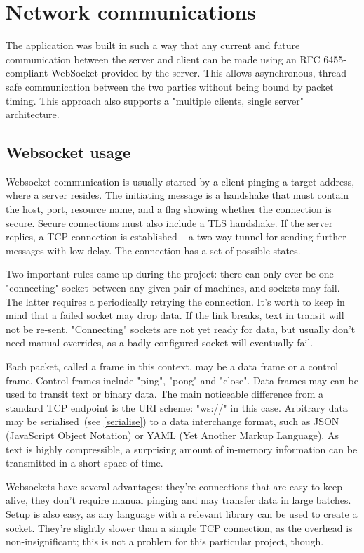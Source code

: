 \chapter{Network communications}
The application was built in such a way that any current and future communication between the server and client can be made using an RFC 6455-compliant\cite{RFC6455} WebSocket provided by the server. This allows asynchronous, thread-safe communication between the two parties without being bound by packet timing. This approach also supports a "multiple clients, single server" architecture.

\section{Websocket usage}
Websocket communication is usually started by a client pinging a target address, where a server resides. The initiating message is a handshake that must contain the host, port, resource name, and a flag showing whether the connection is secure. Secure connections must also include a TLS handshake. If the server replies, a TCP connection is established -- a two-way tunnel for sending further messages with low delay. The connection has a set of possible states.

Two important rules came up during the project: there can only ever be one "connecting" socket between any given pair of machines, and sockets may fail. The latter requires a periodically retrying the connection. It's worth to keep in mind that a failed socket may drop data. If the link breaks, text in transit will not be re-sent. "Connecting" sockets are not yet ready for data, but usually don't need manual overrides, as a badly configured socket will eventually fail.

Each packet, called a frame in this context, may be a data frame or a control frame. Control frames include "ping", "pong" and "close". Data frames may can be used to transit text or binary data. The main noticeable difference from a standard TCP endpoint is the URI scheme: "ws://" in this case. Arbitrary data may be serialised~(see \ref{serialise}) to a data interchange format, such as JSON (JavaScript Object Notation) or YAML (Yet Another Markup Language). As text is highly compressible, a surprising amount of in-memory information can be transmitted in a short space of time.

Websockets have several advantages: they're connections that are easy to keep alive, they don't require manual pinging and may transfer data in large batches. Setup is also easy, as any language with a relevant library can be used to create a socket. They're slightly slower than a simple TCP connection, as the overhead is non-insignificant; this is not a problem for this particular project, though.

